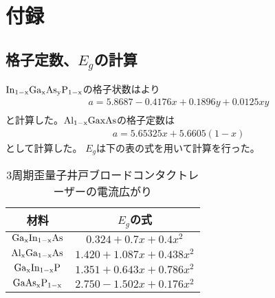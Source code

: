 
\chapter{付録}

\section{格子定数、$E_{g}$の計算}
$\rm{In_{1-x}Ga_{x}As_{y}P_{1-x}}$の格子状数は\cite{ref_iga}より
\begin{eqnarray}
a=5.8687-0.4176x+0.1896y+0.0125xy\\
\end{eqnarray}
と計算した。$\rm{Al_{1-x}Ga{x}As}$の格子定数は
\begin{eqnarray}
a=5.65325x+5.6605(1-x)
\end{eqnarray}
として計算した。
$E_{g}$は下の表の式を用いて計算を行った。
\begin{table}[h]
  \caption{3周期歪量子井戸ブロードコンタクトレーザーの電流広がり}
  \label{table:table_Eg}
  \centering
  \begin{tabular}{cc}
    \hline
    材料& $E_{g}$の式   \\
    \hline \hline
     $\rm{Ga_{x}In_{1-x}As}$ &$0.324+0.7x+0.4x^2$   \\
    $\rm{Al_{x}Ga_{1-x}As}$& $1.420+1.087x+0.438x^2$ \\
    $\rm{Ga_{x}In_{1-x}P}$& $1.351+0.643x+0.786x^2$ \\ 
    $\rm{GaAs_{x}P_{1-x}}$&$2.750-1.502x+0.176x^2$\\
    \hline
  \end{tabular}
\end{table}

